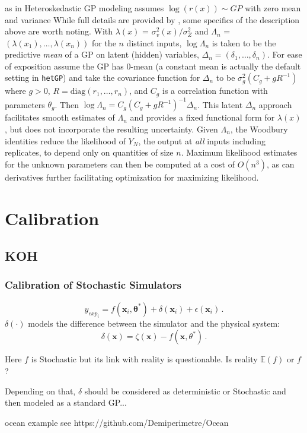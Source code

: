 \documentclass[nopagenumber,9pt]{beamer}
\newcommand{\btheta}{\boldsymbol{\theta}}
\newcommand{\bx}{\mathbf{x}}
\def\ee{{\mathbb E}}
\newcommand{\yexpi}{y_{exp_i}}
\begin{document}
\begin{frame}
 \frametitle{}
 as in \cite{Goldberg1998regression}
 Heteroskedastic GP modeling assumes
 $\log(r(x))\sim GP$
 with zero mean and variance 
 While full details are provided by \cite{Binois2018JCGS}, some specifics of the description above are worth noting.
With $\lambda(x)$ = $\sigma_v^2(x)/\sigma_Z^2$ and $\Lambda_n$  = $(\lambda(x_1), \dots, \lambda(x_n))$ for the $n$ distinct inputs, $\log\Lambda_n$ is taken to be the predictive \emph{mean} of a GP on latent (hidden) variables, $\Delta_n = (\delta_1, \dots, \delta_n)$. For ease of exposition assume the GP has 0-mean (a constant mean is actually the default setting in {\tt hetGP}) and take the covariance function for $\Delta_n$ to be $\sigma_g^2 (C_g + gR^{-1})$ where $g>0$, $R = \textrm{diag}(r_1, \dots, r_n)$, and $C_g$ is a correlation function with parameters $\theta_g$. Then $\log\Lambda_n = C_g(C_g + gR^{-1})^{-1}\Delta_n$. This latent $\Delta_n$ approach facilitates smooth estimates of $\Lambda_n$ and provides a fixed functional form for $\lambda(x)$, but does not incorporate the resulting uncertainty. Given $\Lambda_n$, the Woodbury identities  reduce the likelihood of $Y_N$, the output at \emph{all} inputs including replicates, to depend only on quantities of size $n$. Maximum likelihood estimates for the unknown parameters can then be computed at a cost of $O(n^3)$, as can derivatives further facilitating optimization for maximizing likelihood.
\end{frame}

\section{Calibration}


\subsection{KOH}

\begin{frame}
 \frametitle{Calibration of Stochastic Simulators}
  \begin{equation}
  \label{disc}
 \yexpi=f(\bx_i,\btheta^*)+\delta(\bx_i) +\epsilon(\bx_i)\,.
 \end{equation}
 $\delta(\cdot)$ models the difference between the simulator and the physical system:
 $$\delta(\bx)=\zeta(\bx)-f(\bx,\theta^*) \,.$$


Here $f$ is Stochastic but its link with reality is questionable.
Is reality $\ee(f)$ or $f$?

Depending on that, $\delta$ should be considered as deterministic or Stochastic and then modeled as a standard GP...

\end{frame}
\begin{frame}
 
 ocean example see https://github.com/Demiperimetre/Ocean
 
 
\end{frame}
\end{document}
